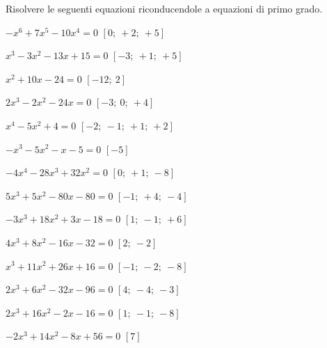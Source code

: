 \begin{esercizio}[\Ast]
\label{ese:20.6}
Risolvere le seguenti equazioni riconducendole a equazioni di primo grado.
\begin{multicols}{2}
\begin{enumeratea}
 \item $-x^{6}+7x^{5}-10x^{4}=0$ \hfill $\left[0;~+2;~+5\right]$
 \item $x^{3}-3x^{2}-13x+15=0$ \hfill $\left[-3;~+1;~+5\right]$
 \item $x^{2}+10x-24=0$ \hfill $\left[-12;~2\right]$
 \item $2x^{3}-2x^{2}-24x=0$ \hfill $\left[-3;~0;~+4\right]$
 \item $x^{4}-5x^{2}+4=0$ \hfill $\left[-2;~-1;~+1;~+2\right]$
 \item $-x^{3}-5x^{2}-x-5=0$ \hfill $\left[-5\right]$
 \item $-4x^{4}-28x^{3}+32x^{2}=0$ \hfill $\left[0;~+1;~-8\right]$
 \item $5x^{3}+5x^{2}-80x-80=0$ \hfill $\left[-1;~+4;~-4\right]$
 \item $-3x^{3}+18x^{2}+3x-18=0$ \hfill $\left[1;~-1;~+6\right]$
 \item $4x^{3}+8x^{2}-16x-32=0$ \hfill $\left[2;~-2\right]$
 \item $x^{3}+11x^{2}+26x+16=0$ \hfill $\left[-1;~-2;~-8\right]$
 \item $2x^{3}+6x^{2}-32x-96=0$ \hfill $\left[4;~-4;~-3\right]$
 \item $2x^{3}+16x^{2}-2x-16=0$ \hfill $\left[1;~-1;~-8\right]$
 \item $-2x^{3}+14x^{2}-8x+56=0$ \hfill $\left[7\right]$
\end{enumeratea}
\end{multicols}
\end{esercizio}

